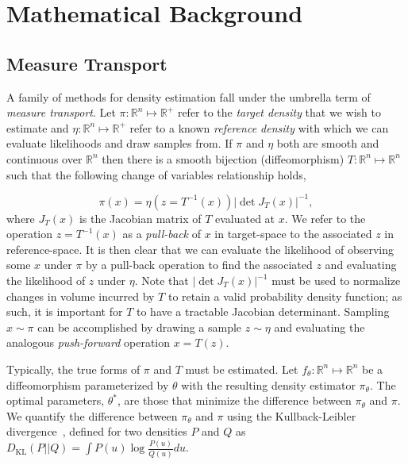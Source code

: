 \chapter{Mathematical Background}\label{ch:background}

\section{Measure Transport}\label{sec:measure-transport}

A family of methods for density estimation fall under the umbrella term of \textit{measure transport}.
Let $\pi: \mathbb{R}^n \mapsto \mathbb{R}^+$ refer to the \textit{target density} that we wish to estimate
and $\eta: \mathbb{R}^n \mapsto \mathbb{R}^+$ refer to a known \textit{reference density} with which we can evaluate
likelihoods and draw samples from.
If $\pi$ and $\eta$ both are smooth and continuous over $\mathbb{R}^n$ then there is a smooth bijection (diffeomorphism)
$T: \mathbb{R}^n \mapsto \mathbb{R}^n$ such that the following change of variables relationship holds,

\begin{equation*}
    \pi(x) = \eta\left( z=T^{-1}(x) \right) \left| \det J_T(x) \right|^{-1},
    \label{eq:change-of-vars}
\end{equation*}
where $J_T(x)$ is the Jacobian matrix of $T$ evaluated at $x$.
We refer to the operation $z = T^{-1}(x)$ as a \textit{pull-back} of $x$ in target-space to the associated $z$ in
reference-space.
It is then clear that we can evaluate the likelihood of observing some $x$ under $\pi$ by a
pull-back operation to find the associated $z$ and evaluating the likelihood of $z$ under $\eta$.
Note that $\left| \det J_T(x) \right|^{-1}$ must be used to normalize changes in volume incurred by $T$ to retain a
valid probability density function; as such, it is important for $T$ to have a tractable Jacobian determinant.
Sampling $x \sim \pi$ can be accomplished by drawing a sample $z \sim \eta$ and evaluating the analogous
\textit{push-forward} operation $x = T(z)$.

Typically, the true forms of $\pi$ and $T$ must be estimated.
Let $f_\theta : \mathbb{R}^n \mapsto \mathbb{R}^n$ be a diffeomorphism parameterized by $\theta$ with the resulting
density estimator $\pi_\theta$.
The optimal parameters, $\theta^*$, are those that minimize the difference between $\pi_\theta$ and $\pi$.
We quantify the difference between $\pi_\theta$ and $\pi$ using the Kullback-Leibler divergence~\cite{kl_div},
defined for two densities $P$ and $Q$ as $D_{\text{KL}}(P || Q) = \int P(u) \log \frac{P(u)}{Q(u)} du$.

